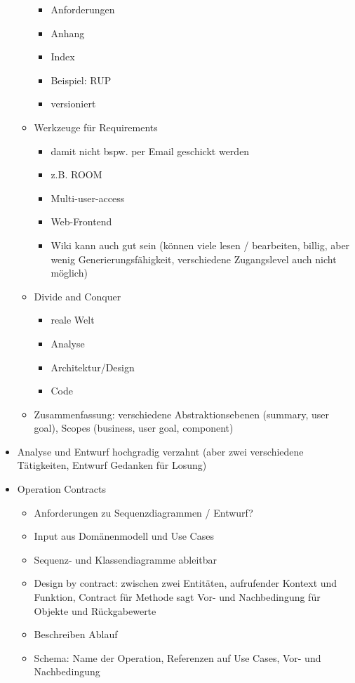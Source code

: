 \documentclass[paper=a4, fontsize=11pt]{scrartcl} %
\numberwithin{equation}{section} %
\numberwithin{figure}{section} %
\numberwithin{table}{section} %
\begin{document}
\begin{itemize}
\begin{itemize}
\begin{itemize}
      \item Anforderungen
      \item Anhang
      \item Index
      \item Beispiel: RUP
      \item versioniert
    \end{itemize}
    \item Werkzeuge für Requirements
    \begin{itemize}
      \item damit nicht bspw. per Email geschickt werden
      \item z.B. ROOM
      \item Multi-user-access
      \item Web-Frontend
      \item Wiki kann auch gut sein (können viele lesen / bearbeiten, billig, aber wenig Generierungsfähigkeit, verschiedene Zugangslevel auch nicht möglich)
    \end{itemize}
    \item Divide and Conquer
    \begin{itemize}
      \item reale Welt
      \item Analyse
      \item Architektur/Design
      \item Code
    \end{itemize}
    \item Zusammenfassung: verschiedene Abstraktionsebenen (summary, user goal), Scopes (business, user goal, component)
  \end{itemize}
  \item Analyse und Entwurf hochgradig verzahnt (aber zwei verschiedene Tätigkeiten, Entwurf Gedanken für Losung)
  \item Operation Contracts
  \begin{itemize}
    \item Anforderungen zu Sequenzdiagrammen / Entwurf?
    \item Input aus Domänenmodell und Use Cases
    \item Sequenz- und Klassendiagramme ableitbar
    \item Design by contract: zwischen zwei Entitäten, aufrufender Kontext und Funktion, Contract für Methode sagt Vor- und Nachbedingung für Objekte und Rückgabewerte
    \item Beschreiben Ablauf
    \item Schema: Name der Operation, Referenzen auf Use Cases, Vor- und Nachbedingung

\end{itemize}
\end{itemize}
\end{document}
